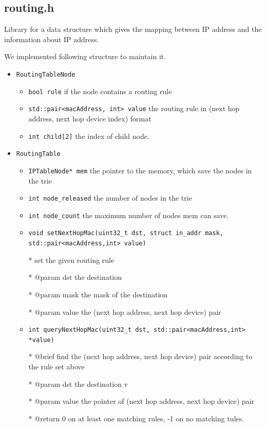 \documentclass[11pt]{article}
\begin{document}
	\subsection*{routing.h}
	
	\par Library for a data structure which gives the mapping between IP address and the information about IP address.
	
	\par We implemented following structure to maintain it.
	
	\begin{itemize}
		\item \texttt{RoutingTableNode}
		
		\begin{itemize}
			\item 
			\texttt{bool rule} if the node contains a routing rule
			\item \texttt{std::pair<macAddress, int> value} the routing rule in (next hop address, next hop device index) format
			\item \texttt{int child[2]} the index of child node.
		\end{itemize}
		
		\item \texttt{RoutingTable}
		
		\begin{itemize}
			\item \texttt{IPTableNode* mem} the pointer to the memory, which save the nodes in the trie
			\item \texttt{int node\_released} the number of nodes in the trie
			\item \texttt{int node\_count} the maximum number of nodes mem can save. 
			\item \texttt{void setNextHopMac(uint32\_t dst, struct in\_addr mask, std::pair<macAddress,int> value)}
			
			* set the given routing rule
			
			* @param dst the destination 
			
			* @param mask the mask of the destination
			
			* @param value the (next hop address, next hop device) pair
			
			
			
			\item \texttt{int queryNextHopMac(uint32\_t dst, std::pair<macAddress,int> *value)}
				
				* @brief find the (next hop address, next hop device) pair according to the rule set above
				
				* @param dst the destination v
				
				* @param value the pointer of (next hop address, next hop device) pair
				
				* @return 0 on at least one matching rules, -1 on no matching tules.
				
		\end{itemize}
	\end{itemize}
	
\end{document}
